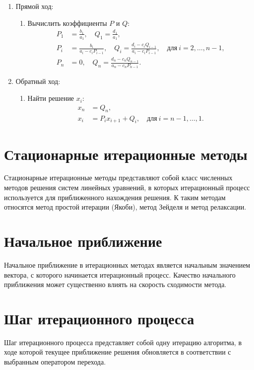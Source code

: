 \documentclass{article}
\begin{document}
\begin{enumerate}
    \item Прямой ход:
    \begin{enumerate}
        \item Вычислить коэффициенты \(P\) и \(Q\):
        \begin{align*}
            P_1 &= \frac{b_1}{a_1}, \quad Q_1 = \frac{d_1}{a_1}, \\
            P_i &= \frac{b_i}{a_i - c_i P_{i-1}}, \quad Q_i = \frac{d_i - c_i Q_{i-1}}{a_i - c_i P_{i-1}}, \quad \text{для} \ i = 2, \ldots, n-1, \\
            P_n &= 0, \quad Q_n = \frac{d_n - c_n Q_{n-1}}{a_n - c_n P_{n-1}}.
        \end{align*}
    \end{enumerate}
    \item Обратный ход:
    \begin{enumerate}
        \item Найти решение \(x_i\):
        \begin{align*}
            x_n &= Q_n, \\
            x_i &= P_i x_{i+1} + Q_i, \quad \text{для} \ i = n-1, \ldots, 1.
        \end{align*}
    \end{enumerate}
\end{enumerate}
\section{Стационарные итерационные методы}
Стационарные итерационные методы представляют собой класс численных методов решения систем линейных уравнений, в которых итерационный процесс используется для приближенного нахождения решения. К таким методам относятся метод простой итерации (Якоби), метод Зейделя и метод  релаксации.

\section{Начальное приближение}
Начальное приближение в итерационных методах является начальным значением вектора, с которого начинается итерационный процесс. Качество начального приближения может существенно влиять на скорость сходимости метода.

\section{Шаг итерационного процесса}
Шаг итерационного процесса представляет собой одну итерацию алгоритма, в ходе которой текущее приближение решения обновляется в соответствии с выбранным оператором перехода.
\end{document}
